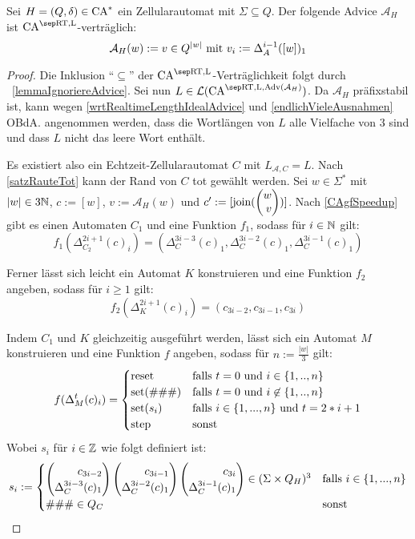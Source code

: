 \begin{theorem}
    \label{thmAdviceMain}
    Sei $H = (Q, \delta) \in \textrm{CA}^*$ ein Zellularautomat mit $\Sigma \subseteq Q$.
    Der folgende Advice $\mathcal{A}_H$ ist $\CAM{\CART, \CALeft}$-verträglich:
    \[
        \mathcal{A}_H(w) := v \in Q^{|w|} \text{ mit } v_i := \Delta_A^{i-1}([w])_1 \\
    \]
\end{theorem}
\begin{proof}
    Die Inklusion \enquote{$\subseteq$} der $\CAM{\CART, \CALeft}$-Verträglichkeit folgt durch ~\cref{lemmaIgnoriereAdvice}.
    Sei nun $L \in \CAL{\CART, \CALeft, \orakel({\mathcal{A}_H})}$.
    Da $\mathcal{A}_H$ präfixstabil ist, kann wegen \cref{wrtRealtimeLengthIdealAdvice} und \cref{endlichVieleAusnahmen}
    \ac{OBdA.} angenommen werden,
    dass die Wortlängen von $L$ alle Vielfache von $3$ sind und dass $L$ nicht das leere Wort enthält.

    Es existiert also ein Echtzeit-Zellularautomat $C$ mit $L_{\mathcal{A}, C} = L$. Nach \cref{satzRauteTot} kann der Rand von $C$ tot gewählt werden.
    Sei $w \in \Sigma^*$ mit $|w| \in 3\mathbb{N}$, $c := [w]$, $v := \mathcal{A}_H(w)$ und $c' := [\comb(\Spvek{ w; v})]$.
    Nach \cref{CAgfSpeedup} gibt es einen Automaten $C_1$ und eine Funktion $f_1$, sodass für $i \in \mathbb{N}$ gilt:
    \[
        f_1(\Delta_{C_2}^{2i+1}(c)_i) = (\Delta_C^{3i-3}(c)_1, \Delta_C^{3i-2}(c)_1, \Delta_C^{3i-1}(c)_1)
    \]
    
    Ferner lässt sich leicht ein Automat $K$ konstruieren und eine Funktion $f_2$ angeben, sodass für $i \geq 1$ gilt:
    \[
        f_2(\Delta_{K}^{2i+1}(c)_i) = (c_{3i-2}, c_{3i-1}, c_{3i})
    \]
    
    Indem $C_1$ und $K$ gleichzeitig ausgeführt werden, lässt sich ein Automat $M$ konstruieren und eine Funktion $f$ angeben,
    sodass für $n := \frac{|w|}{3}$ gilt:
    \[
        f(\Delta_M^t(c)_i) =
        \begin{cases}
            \mathrm{reset} & \text{falls } t = 0 \text{ und } i \in \{ {1, .., n} \} \\
            \mathrm{set}(\#\#\#) & \text{falls } t = 0 \text{ und } i \not\in \{ {1, .., n} \} \\
            \mathrm{set}(s_i)
                & \text{falls } i \in \{ {1, ..., n} \} \text{ und } t = 2 * i + 1 \\
            \mathrm{step} & \text{sonst}
        \end{cases}
    \]
    Wobei $s_i$ für $i \in \mathbb{Z}$ wie folgt definiert ist:
    \[
        s_i := \begin{cases}
                    \Spvek{ c_{3i-2} ; \Delta_C^{3i-3}(c)_1 }
                        \Spvek{ c_{3i-1} ; \Delta_C^{3i-2}(c)_1} 
                        \Spvek{ c_{3i} ; \Delta_C^{3i-1}(c)_1}
                        \in (\Sigma \times Q_H)^3
                        & \text{falls } i \in \finset{ 1, ..., n } \\
                    \#\#\# \in Q_C & \text{sonst} 
                \end{cases}
    \]
    

\end{proof}
